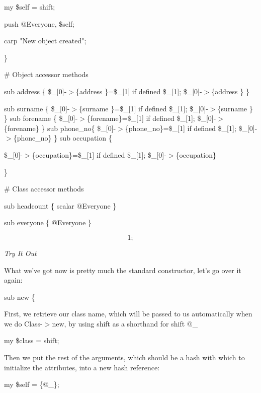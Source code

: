 \documentclass[a4paper,11pt]{book}
\begin{document}
\noindent my \$self = shift;

\noindent push @Everyone, \$self;

\noindent carp "New object created";

\noindent \}

\noindent 

\noindent \# Object accessor methods

\noindent sub address  \{ \$\_[0]-$>$\{address \}=\$\_[1] if defined \$\_[1]; \$\_[0]-$>$\{address \} \}

\noindent sub surname  \{ \$\_[0]-$>$\{surname \}=\$\_[1] if defined \$\_[1]; \$\_[0]-$>$\{surname \} \} sub forename \{ \$\_[0]-$>$\{forename\}=\$\_[1] if defined \$\_[1]; \$\_[0]-$>$\{forename\} \} sub phone\_no\{ \$\_[0]-$>$\{phone\_no\}=\$\_[1] if defined \$\_[1]; \$\_[0]-$>$\{phone\_no\} \} sub occupation  \{

\noindent \$\_[0]-$>$\{occupation\}=\$\_[1] if defined \$\_[1]; \$\_[0]-$>$\{occupation\}

\noindent \}

\noindent 

\noindent \# Class accessor methods

\noindent sub headcount \{ scalar @Everyone \}

\noindent sub everyone  \{ @Everyone \}

\noindent 

\[1;\] 


\noindent \textit{Try It Out}

\noindent What we've got now is pretty much the standard constructor, let's go over it again:

\noindent 

\noindent 

\noindent sub new \{

\noindent 

\noindent First, we retrieve our class name, which will be passed to us automatically when we do Class-$>$new, by using shift as a shorthand for shift @\_

\noindent 

\noindent 

\noindent my \$class = shift;

\noindent 

\noindent Then we put the rest of the arguments, which should be a hash with which to initialize the attributes, into a new hash reference:

\noindent 

\noindent my \$self = \{@\_\};
\end{document}
